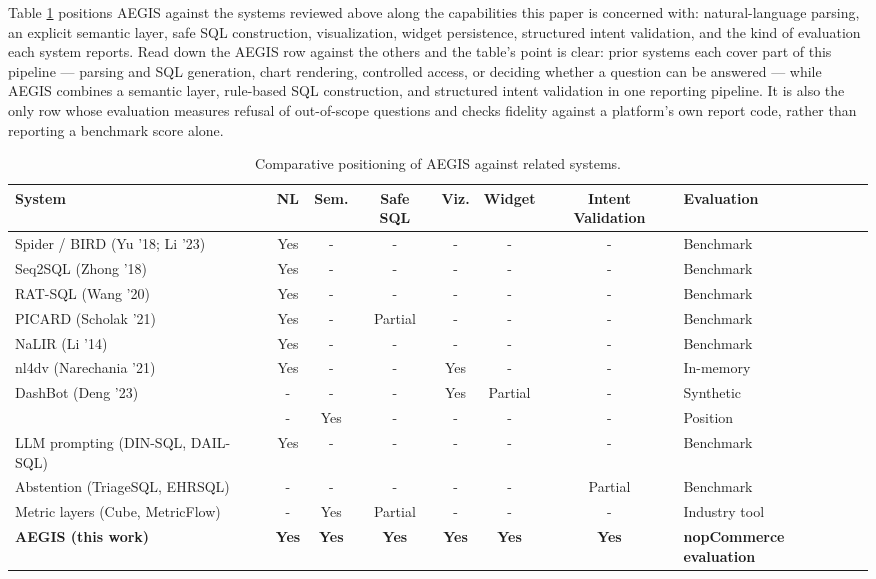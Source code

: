 \documentclass[pdflatex,sn-mathphys-num]{sn-jnl}
\begin{document}
Table \ref{tab:1} positions AEGIS against the systems reviewed above along the capabilities this paper is concerned with: natural-language parsing, an explicit semantic layer, safe SQL construction, visualization, widget persistence, structured intent validation, and the kind of evaluation each system reports. Read down the AEGIS row against the others and the table's point is clear: prior systems each cover part of this pipeline — parsing and SQL generation, chart rendering, controlled access, or deciding whether a question can be answered — while AEGIS combines a semantic layer, rule-based SQL construction, and structured intent validation in one reporting pipeline. It is also the only row whose evaluation measures refusal of out-of-scope questions and checks fidelity against a platform's own report code, rather than reporting a benchmark score alone.


\begin{table}[t]
\caption{Comparative positioning of AEGIS against related systems.}
\label{tab:1}
\centering
\scriptsize
\setlength{\tabcolsep}{3pt}
\renewcommand{\arraystretch}{1.2}
\begin{tabular}{p{}ccccccp{}}
\toprule
System & NL & Sem. & Safe SQL & Viz. & Widget & Intent Validation & Evaluation \\
\midrule
Spider / BIRD (Yu '18; Li '23) & Yes & - & - & - & - & - & Benchmark \\
Seq2SQL (Zhong '18) & Yes & - & - & - & - & - & Benchmark \\
RAT-SQL (Wang '20) & Yes & - & - & - & - & - & Benchmark \\
PICARD (Scholak '21) & Yes & - & Partial & - & - & - & Benchmark \\
NaLIR (Li '14) & Yes & - & - & - & - & - & Benchmark \\
nl4dv (Narechania '21) & Yes & - & - & Yes & - & - & In-memory \\
DashBot (Deng '23) & - & - & - & Yes & Partial & - & Synthetic \\
\citet{lehmann2022veezoo} & - & Yes & - & - & - & - & Position \\
LLM prompting (DIN-SQL, DAIL-SQL) & Yes & - & - & - & - & - & Benchmark \\
Abstention (TriageSQL, EHRSQL) & - & - & - & - & - & Partial & Benchmark \\
Metric layers (Cube, MetricFlow) & - & Yes & Partial & - & - & - & Industry tool \\
\textbf{AEGIS (this work)} & \textbf{Yes} & \textbf{Yes} & \textbf{Yes} & \textbf{Yes} & \textbf{Yes} & \textbf{Yes} & \textbf{nopCommerce evaluation} \\
\bottomrule
\end{tabular}
\end{table}
\end{document}
